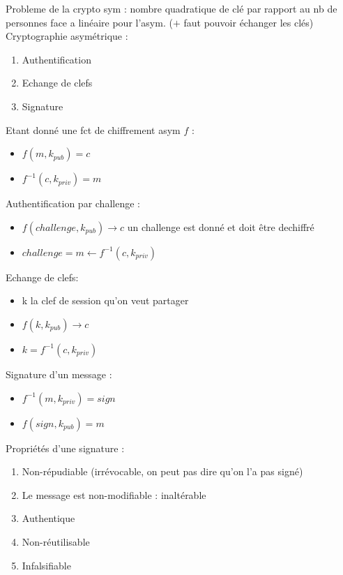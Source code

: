 \documentclass[12pt]{article}
\theoremstyle{plain}
\theoremstyle{definition}
\begin{document}
Probleme de la crypto sym : nombre quadratique de clé par rapport au nb de personnes face a linéaire pour l'asym. ($+$ faut pouvoir échanger les clés)\\

\noindent Cryptographie asymétrique : \begin{enumerate}
    \item Authentification
    \item Echange de clefs
    \item Signature
\end{enumerate}

Etant donné une fct de chiffrement asym $f$ :
\begin{itemize}
    \item $f(m,k_{pub})=c$
    \item $f^{-1}(c, k_{priv})=m$
\end{itemize}
Authentification par challenge :
\begin{itemize}
    \item $f(challenge,k_{pub})\rightarrow c$ un challenge est donné et doit être dechiffré
    \item $challenge=m\leftarrow f^{-1}(c,k_{priv})$ 
\end{itemize}

\noindent Echange de clefs:
\begin{itemize}
    \item k la clef de session qu'on veut partager
    \item $f(k,k_{pub})\rightarrow c$ 
    \item $k=f^{-1}(c, k_{priv})$
\end{itemize}
\noindent Signature d'un message :
\begin{itemize}
    \item $f^{-1}(m, k_{priv})=sign$
    \item $f(sign, k_{pub})=m$
\end{itemize}

Propriétés d'une signature :
\begin{enumerate}
    \item Non-répudiable (irrévocable, on peut pas dire qu'on l'a pas signé)
    \item Le message est non-modifiable : inaltérable
    \item Authentique
    \item Non-réutilisable
    \item Infalsifiable
\end{enumerate}
\end{document}
